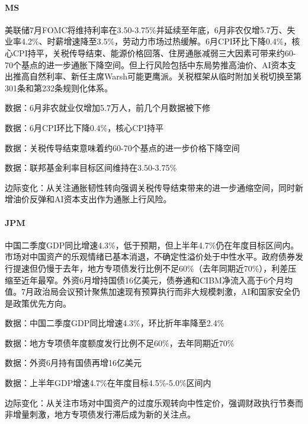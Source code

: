 \documentclass[11pt]{ctexart}
\begin{document}
\paragraph{MS} 美联储7月FOMC将维持利率在3.50-3.75\%并延续至年底，6月非农仅增5.7万、失业率4.2\%、时薪增速降至3.5\%，劳动力市场过热缓解。6月CPI环比下降0.4\%，核心CPI持平，关税传导结束、能源价格回落、住房通胀减弱三大因素可带来约60-70个基点的进一步通胀下降空间。但上行风险包括中东局势推高油价、AI资本支出推高自然利率、新任主席Warsh可能更鹰派。关税框架从临时附加关税切换至第301条和第232条规则化体系。
{\small\color{refgray}数据：6月非农就业仅增加5.7万人，前几个月数据被下修\par}
{\small\color{refgray}数据：6月CPI环比下降0.4\%，核心CPI持平\par}
{\small\color{refgray}数据：关税传导结束意味着约60-70个基点的进一步价格下降空间\par}
{\small\color{refgray}数据：联邦基金利率目标区间维持在3.50-3.75\%\par}
{\small\color{refgray}边际变化：从关注通胀韧性转向强调关税传导结束带来的进一步通缩空间，同时新增油价反弹和AI资本支出作为通胀上行风险。\par}
\paragraph{JPM} 中国二季度GDP同比增速4.3\%，低于预期，但上半年4.7\%仍在年度目标区间内。市场对中国资产的乐观情绪已基本消退，不确定性溢价处于中性水平。政府债券发行提速但仍慢于去年，地方专项债发行比例不足60\%（去年同期近70\%），利差压缩至近年最窄。外资6月增持国债16亿美元，债券通和CIBM净流入高于6个月均值。7月政治局会议预计聚焦加速现有预算执行而非大规模刺激，AI和国家安全仍是政策优先方向。
{\small\color{refgray}数据：中国二季度GDP同比增速4.3\%，环比折年率降至2.4\%\par}
{\small\color{refgray}数据：地方专项债年度额度发行比例不足60\%，去年同期近70\%\par}
{\small\color{refgray}数据：外资6月持有国债再增16亿美元\par}
{\small\color{refgray}数据：上半年GDP增速4.7\%在年度目标4.5\%-5.0\%区间内\par}
{\small\color{refgray}边际变化：从关注市场对中国资产的过度乐观转向中性定价，强调财政执行节奏而非增量刺激，地方专项债发行滞后成为新的关注点。\par}
\end{document}

